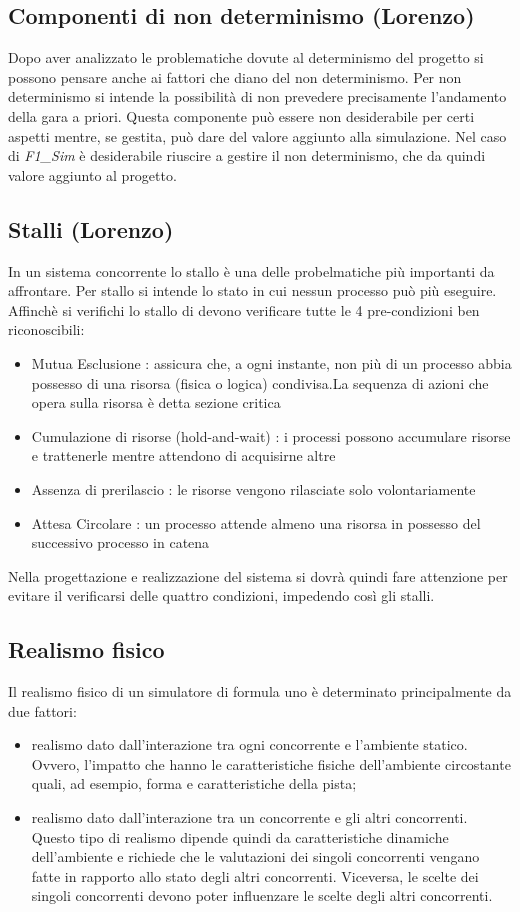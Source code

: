 \subsection{Componenti di non determinismo (Lorenzo)}
\label{non_determinismo}
Dopo aver analizzato le problematiche dovute al determinismo del progetto si possono pensare anche ai fattori che diano del non determinismo.
Per non determinismo si intende la possibilit\`{a} di non prevedere precisamente l'andamento della gara a priori. Questa componente pu\`{o} essere non desiderabile per certi aspetti mentre, se gestita, pu\`{o} dare del valore aggiunto alla simulazione. Nel caso di \emph{F1\_Sim} \`{e} desiderabile riuscire a gestire il non determinismo, che da quindi valore aggiunto al progetto.
\subsection{Stalli (Lorenzo)}
\label{stalli}
In un sistema concorrente lo stallo è una delle probelmatiche pi\`{u} importanti da affrontare. Per stallo si intende lo stato in cui nessun processo pu\`{o} pi\`{u} eseguire. Affinch\`{e} si verifichi lo stallo di devono verificare tutte le 4 pre-condizioni ben riconoscibili:
\begin{itemize}
\item {Mutua Esclusione :} assicura che, a ogni instante, non pi\`{u} di un processo abbia possesso di una risorsa (fisica o logica) condivisa.La sequenza di azioni che opera sulla risorsa \`{e} detta sezione critica
\item{Cumulazione di risorse (hold-and-wait) :} i processi possono accumulare risorse e trattenerle mentre attendono di acquisirne altre
\item{Assenza di prerilascio :} le risorse vengono rilasciate solo volontariamente
\item{Attesa Circolare :} un processo attende almeno una risorsa in possesso del successivo processo in catena
\end{itemize}
Nella progettazione e realizzazione del sistema si dovr\`{a} quindi fare attenzione per evitare il verificarsi delle quattro condizioni, impedendo cos\`{i} gli stalli.
\subsection{Realismo fisico}
Il realismo fisico di un simulatore di formula uno è determinato principalmente da due fattori:
\begin{itemize}
\item realismo dato dall'interazione tra ogni concorrente e l'ambiente statico. Ovvero, l'impatto che hanno
le caratteristiche fisiche dell'ambiente circostante quali, ad esempio, forma e caratteristiche della pista;
\item realismo dato dall'interazione tra un concorrente e gli altri concorrenti. Questo tipo di realismo 
dipende quindi da caratteristiche dinamiche dell'ambiente e richiede che le valutazioni dei singoli concorrenti
vengano fatte in rapporto allo stato degli altri concorrenti. Viceversa, le scelte dei singoli concorrenti
devono poter influenzare le scelte degli altri concorrenti.
\end{itemize}
